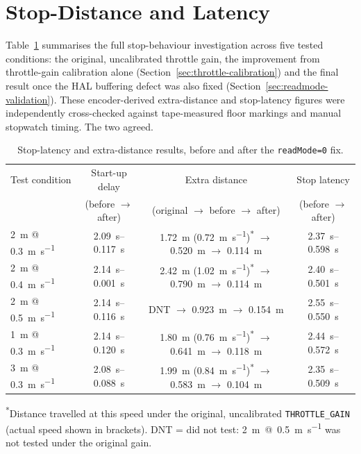 \section{Stop-Distance and Latency}
\label{sec:results-stop-distance}

Table~\ref{tab:results-stop-distance} summarises the full stop-behaviour
investigation across five tested conditions: the original, uncalibrated
throttle gain, the improvement from throttle-gain calibration alone
(Section~\ref{sec:throttle-calibration}) and the final result once the
HAL buffering defect was also fixed
(Section~\ref{sec:readmode-validation}). These encoder-derived
extra-distance and stop-latency figures were independently
cross-checked against tape-measured floor markings and manual
stopwatch timing. The two agreed.

\begin{table}[htbp]
  \centering
  \small
  \caption{Stop-latency and extra-distance results, before and after the \texttt{readMode=0} fix.}
  \label{tab:results-stop-distance}
  \begin{tabular}{@{}lccc@{}}
    \toprule
    Test condition & Start-up delay & Extra distance & Stop latency \\
    & (before $\to$ after) & (original $\to$ before $\to$ after) & (before $\to$ after) \\
    \midrule
    \SI{2}{\meter} @ \SI{0.3}{\meter\per\second} & \SIrange{2.09}{0.117}{\second} & \SI{1.72}{\meter} (\SI{0.72}{\meter\per\second})\textsuperscript{*} $\to$ \SI{0.520}{\meter} $\to$ \SI{0.114}{\meter} & \SIrange{2.37}{0.598}{\second} \\
    \SI{2}{\meter} @ \SI{0.4}{\meter\per\second} & \SIrange{2.14}{0.001}{\second} & \SI{2.42}{\meter} (\SI{1.02}{\meter\per\second})\textsuperscript{*} $\to$ \SI{0.790}{\meter} $\to$ \SI{0.114}{\meter} & \SIrange{2.40}{0.501}{\second} \\
    \SI{2}{\meter} @ \SI{0.5}{\meter\per\second} & \SIrange{2.14}{0.116}{\second} & DNT $\to$ \SI{0.923}{\meter} $\to$ \SI{0.154}{\meter} & \SIrange{2.55}{0.550}{\second} \\
    \SI{1}{\meter} @ \SI{0.3}{\meter\per\second} & \SIrange{2.14}{0.120}{\second} & \SI{1.80}{\meter} (\SI{0.76}{\meter\per\second})\textsuperscript{*} $\to$ \SI{0.641}{\meter} $\to$ \SI{0.118}{\meter} & \SIrange{2.44}{0.572}{\second} \\
    \SI{3}{\meter} @ \SI{0.3}{\meter\per\second} & \SIrange{2.08}{0.088}{\second} & \SI{1.99}{\meter} (\SI{0.84}{\meter\per\second})\textsuperscript{*} $\to$ \SI{0.583}{\meter} $\to$ \SI{0.104}{\meter} & \SIrange{2.35}{0.509}{\second} \\
    \bottomrule
  \end{tabular}

  \vspace{2pt}
  \raggedright\footnotesize\textsuperscript{*}Distance travelled at
  this speed under the original, uncalibrated \texttt{THROTTLE\_GAIN}
  (actual speed shown in brackets). DNT = did not test:
  \SI{2}{\meter}~@~\SI{0.5}{\meter\per\second} was not tested under the
  original gain.
\end{table}

